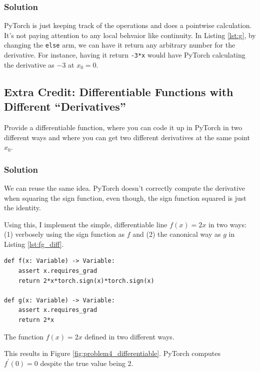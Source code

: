 \documentclass[letterpaper,11pt]{article}
\begin{document}
\begin{enumerate}
  \subsubsection*{Solution}

  PyTorch is just keeping track of the operations and does a pointwise
  calculation. It's not paying attention to any local behvaior like
  continuity. In Listing \ref{lst:g}, by changing the \texttt{else}
  arm, we can have it return any arbitrary number for the
  derivative. For instance, having it return \texttt{-3*x} would have
  PyTorch calculating the derivative as $-3$ at $x_0 = 0$.
\end{enumerate}

\subsection*{Extra Credit: Differentiable Functions with Different ``Derivatives''}

Provide a differentiable function, where you can code it up in PyTorch
in two different ways and where you can get two different derivatives
at the same point $x_0$.

\subsubsection*{Solution}

We can reuse the same idea. PyTorch doesn't correctly compute the
derivative when squaring the sign function, even though, the sign
function squared is just the identity.

Using this, I implement the simple, differentiable line $f(x) = 2x$ in
two ways: (1) verbosely using the sign function as $f$ and (2) the
canonical way as $g$ in Listing \ref{lst:fg_diff}.

\begin{listing}
\begin{verbatim}
def f(x: Variable) -> Variable:
    assert x.requires_grad
    return 2*x*torch.sign(x)*torch.sign(x)

def g(x: Variable) -> Variable:
    assert x.requires_grad
    return 2*x
\end{verbatim}
  \caption{The function $f(x) = 2x$ defined in two different ways.}
\label{lst:fg_diff}
\end{listing}

This results in Figure \ref{fig:problem4_differentiable}. PyTorch
computes $f^\prime(0) = 0$ despite the true value being $2$.
\end{document}
